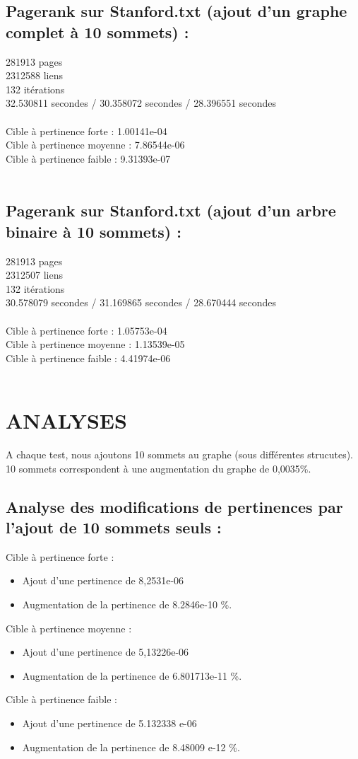 \documentclass[a4paper,11pt]{article}
\begin{document}
	\subsection{Pagerank sur Stanford.txt (ajout d'un graphe complet à 10 sommets) :}
		281913 pages\\
		2312588 liens\\
		132 itérations\\
		32.530811 secondes / 30.358072 secondes / 28.396551 secondes\\
		\\
		Cible à pertinence forte : 1.00141e-04\\	
		Cible à pertinence moyenne : 7.86544e-06\\
		Cible à pertinence faible : 9.31393e-07\\
		\\
	\subsection{Pagerank sur Stanford.txt (ajout d'un arbre binaire à 10 sommets) :}
		281913 pages\\
		2312507 liens\\
		132 itérations\\
		30.578079 secondes / 31.169865 secondes / 28.670444 secondes\\
		\\
		Cible à pertinence forte : 1.05753e-04\\
		Cible à pertinence moyenne : 1.13539e-05\\
		Cible à pertinence faible : 4.41974e-06\\
		\\
\section{ANALYSES}
	A chaque test, nous ajoutons 10 sommets au graphe (sous différentes strucutes). 10 sommets correspondent à une augmentation du graphe de 0,0035\%.\\
	\subsection{Analyse des modifications de pertinences par l'ajout de 10 sommets seuls :}
		Cible à pertinence forte :
		\begin{itemize} 	
			\item Ajout d'une pertinence de 8,2531e-06
			\item Augmentation de la pertinence de 8.2846e-10 \%.
		\end{itemize}
		Cible à pertinence moyenne :
		\begin{itemize} 	
			\item Ajout d'une pertinence de 5,13226e-06
			\item Augmentation de la pertinence de 6.801713e-11 \%.
		\end{itemize}
		Cible à pertinence faible :
		\begin{itemize} 	
			\item Ajout d'une pertinence de 5.132338 e-06
			\item Augmentation de la pertinence de 8.48009 e-12 \%.
		\end{itemize}
\end{document}
